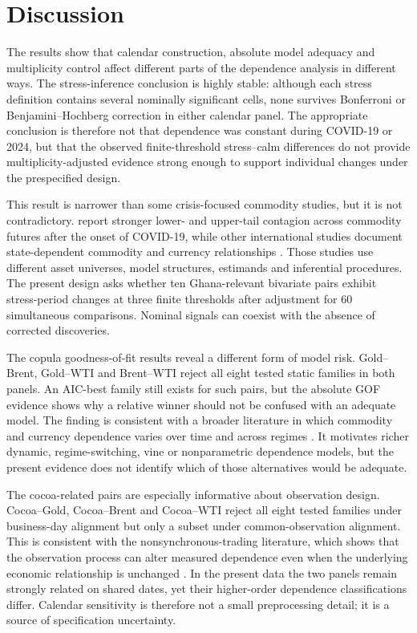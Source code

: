 \section{Discussion}
\label{sec:discussion}

The results show that calendar construction, absolute model adequacy and multiplicity control affect different parts of the dependence analysis in different ways. The stress-inference conclusion is highly stable: although each stress definition contains several nominally significant cells, none survives Bonferroni or Benjamini--Hochberg correction in either calendar panel. The appropriate conclusion is therefore not that dependence was constant during COVID-19 or 2024, but that the observed finite-threshold stress--calm differences do not provide multiplicity-adjusted evidence strong enough to support individual changes under the prespecified design.

This result is narrower than some crisis-focused commodity studies, but it is not contradictory. \citet{qiao2023} report stronger lower- and upper-tail contagion across commodity futures after the onset of COVID-19, while other international studies document state-dependent commodity and currency relationships \citep{ignatieva2017,go2024,ning2025}. Those studies use different asset universes, model structures, estimands and inferential procedures. The present design asks whether ten Ghana-relevant bivariate pairs exhibit stress-period changes at three finite thresholds after adjustment for 60 simultaneous comparisons. Nominal signals can coexist with the absence of corrected discoveries.

The copula goodness-of-fit results reveal a different form of model risk. Gold--Brent, Gold--WTI and Brent--WTI reject all eight tested static families in both panels. An AIC-best family still exists for such pairs, but the absolute GOF evidence shows why a relative winner should not be confused with an adequate model. The finding is consistent with a broader literature in which commodity and currency dependence varies over time and across regimes \citep{ignatieva2017,ning2025}. It motivates richer dynamic, regime-switching, vine or nonparametric dependence models, but the present evidence does not identify which of those alternatives would be adequate.

The cocoa-related pairs are especially informative about observation design. Cocoa--Gold, Cocoa--Brent and Cocoa--WTI reject all eight tested families under business-day alignment but only a subset under common-observation alignment. This is consistent with the nonsynchronous-trading literature, which shows that the observation process can alter measured dependence even when the underlying economic relationship is unchanged \citep{scholes1977,lo1990,martens2001,schotman2006}. In the present data the two panels remain strongly related on shared dates, yet their higher-order dependence classifications differ. Calendar sensitivity is therefore not a small preprocessing detail; it is a source of specification uncertainty.

